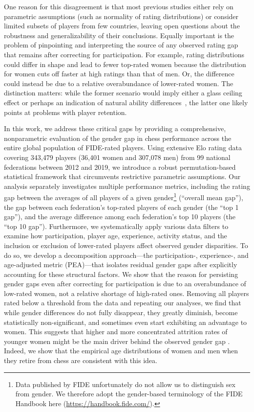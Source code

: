 \documentclass[9pt,twocolumn,twoside,lineno]{pnas-new}
\begin{document}
One reason for this disagreement is that most previous studies either rely on parametric assumptions (such as normality of rating distributions) or consider limited subsets of players from few countries, leaving open questions about the robustness and generalizability of their conclusions. Equally important is the problem of pinpointing and interpreting the source of any observed rating gap that remains after correcting for participation. For example, rating distributions could differ in shape and lead to fewer top-rated women because the distribution for women cuts off faster at high ratings than that of men. Or, the difference could instead be due to a relative overabundance of lower-rated women. The distinction matters: while the former scenario would imply either a glass ceiling effect \cite{howard2005} or perhaps an indication of natural ability differences~\cite{howard2014jbs, howard2014explaining}, the latter one likely points at problems with player retention.

In this work, we address these critical gaps by providing a comprehensive, nonparametric evaluation of the gender gap in chess performance across the entire global population of FIDE-rated players. Using extensive Elo rating data covering 343,479 players (36,401 women and 307,078 men) from 99 national federations between 2012 and 2019, we introduce a robust permutation-based statistical framework that circumvents restrictive parametric assumptions. Our analysis separately investigates multiple performance metrics, including the rating gap between the averages of all players of a given gender\footnote{Data published by FIDE unfortunately do not allow us to distinguish sex from gender. We therefore adopt the gender-based terminology of the FIDE Handbook here (\url{https://handbook.fide.com/}).} (``overall mean gap''), the gap between each federation's top-rated players of each gender (the ``top 1 gap''), and the average difference among each federation's top 10 players (the ``top 10 gap''). Furthermore, we systematically apply various data filters to examine how participation, player age, experience, activity status, and the inclusion or exclusion of lower-rated players affect observed gender disparities. To do so, we develop a decomposition approach---the participation-, experience-, and age-adjusted metric (PEA)---that isolates residual gender gaps after explicitly accounting for these structural factors. We show that the reason for persisting gender gaps even after correcting for participation is due to an overabundance of low-rated women, not a relative shortage of high-rated ones. Removing all players rated below a threshold from the data and repeating our analyses, we find that while gender differences do not fully disappear, they greatly diminish, become statistically non-significant, and sometimes even start exhibiting an advantage to women. This suggests that higher and more concentrated attrition rates of younger women might be the main driver behind the observed gender gap \cite{li2025across}. Indeed, we show that the empirical age distributions of women and men when they retire from chess are consistent with this idea.
\end{document}
